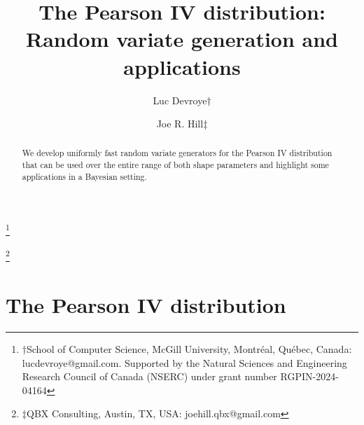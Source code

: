 \documentclass[12pt,reqno,tbtags]{amsart}
\begin{document}
\title[PearsonIV]{The Pearson IV distribution: Random variate generation and applications}

\author{Luc Devroye$\dagger$}
\thanks{$\dagger$School of Computer Science, McGill University, 
		Montr\'eal, Qu\'ebec,  Canada: {lucdevroye@gmail.com}. Supported by the Natural Sciences and Engineering Research Council of Canada (NSERC) under grant number RGPIN-2024-04164}
 
 \author{Joe R. Hill$\ddagger$}
\thanks{$\ddagger$QBX Consulting, Austin, TX, USA: {joehill.qbx@gmail.com}}






\begin{abstract}
We develop uniformly fast random variate generators for
the Pearson IV distribution that can be used over the entire
range of both shape parameters and highlight some applications in a Bayesian setting.
\end{abstract}





\maketitle






















\section{The Pearson IV distribution}\label{pearsonIV}
\end{document}
